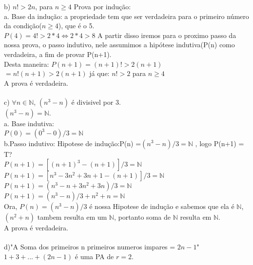 \documentclass[a4paper, 10pt]{article}
\begin{document}
\newpage

\noindent b) $n! > 2n$, para $n\geq 4$
{Prova por indução:} \\

\noindent a. {Base da indução:} a propriedade tem que ser verdadeira para o primeiro número da condição($n\geq4$), que é o 5. \checkmark\\
$P(4) = 4! > 2*4 \Longleftrightarrow 2*4>8$
A partir disso iremos para o proximo passo da nossa prova, o {passo indutivo}, nele assumimos a {hipótese indutiva}(P(n) como verdadeira, a fim de provar P(n+1).\\
Desta maneira: $P(n+1) = (n+1)!>2(n+1)$ \\ 
$=n!(n+1)>2(n+1)$ já que: $n! > 2$ para $n \geq 4$ \\
A prova é verdadeira.\checkmark\\ 
\\

\noindent c)  $\forall n \in \mathbb{N}$, $(n^3-n)$ é divisivel por 3.  \\
$(n^3 - n) = \mathbb{N}$.\\

\noindent a. Base indutiva: \\
$P(0) = (0^3 - 0)/3 = \mathbb{N}$\checkmark\\

\noindent b.Passo indutivo: Hipotese de indução:P(n) =$(n^3 - n)/3 = \mathbb{N}$ , logo P(n+1) = T? \\

$P(n+1) = [(n+1)^3 - (n+1)]/3 = \mathbb{N}$ \\

$P(n+1) = [n^3 - 3n^2 + 3n + 1 - (n+1)]/3 = \mathbb{N}$ \\

$P(n+1) = (n^3 - n + 3n^2 + 3n)/3 = \mathbb{N}$ \\

$P(n+1) =(n^3 - n)/3 + n^2 + n = \mathbb{N}$ \\

\noindent Ora, $P(n) =(n^3 - n)/3$ é nossa Hipotese de indução e sabemos que ela é $\mathbb{N}$, $(n^2 + n) $ tambem resulta em um $\mathbb{N}$, portanto soma de $\mathbb{N}$ resulta em $\mathbb{N}$. \\
A prova é verdadeira. \checkmark\\
\\ 


\noindent d)"A Soma dos primeiros n primeiros numeros impares = $2n-1$" \\
 $1+3+...+(2n-1)$ é uma PA de $r=2$. \\
 
\end{document}
